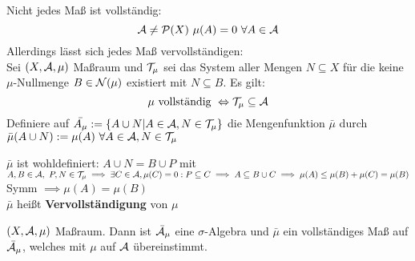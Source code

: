 \documentclass[11pt,a4paper,fleqn,openany]{report}
\begin{document}
    \begin{remark}
      Nicht jedes Maß ist vollständig:
      \[
        \script{A} \neq \script{P}(X) \ \mu(A) = 0 \ \forall A \in \script{A}
      \]
      Allerdings lässt sich jedes Maß vervollständigen:\\
      Sei $(X, \mathcal{A}, \mu)$ Maßraum und $\mathcal{T}_{\mu}$ sei das System aller Mengen $N \subseteq X$ für die keine $\mu$-Nullmenge $B \in \mathcal{N}(\mu)$ existiert mit $N \subseteq B$. Es gilt:\\
      \[
        \mu \text{ vollständig } \Leftrightarrow \mathcal{T}_{\mu} \subseteq \mathcal{A}
      \]
      Definiere auf $\bar{A_{\mu}} := \{A \cup N | A \in \mathcal{A}, N \in \mathcal{T}_{\mu}\}$ die Mengenfunktion $\bar{\mu}$ durch $\bar{\mu}(A\cup N) := \mu(A) \ \forall A \in \mathcal{A}, N\in \mathcal{T}_{\mu}$
    \end{remark}

    \begin{remark}
      $\bar{\mu}$ ist wohldefiniert: $A \cup N = B \cup P$ mit $A,B\in \mathcal{A}, \ P,N \in \mathcal{T}_{\mu} \implies \exists C \in \mathcal{A}, \mu(C) = 0: P \subseteq C \implies A \subseteq B \cup C \implies \mu(A) \leq \mu(B) + \mu(C) = \mu(B)$\\
      Symm $\implies \mu(A) = \mu(B)$\\
      $\bar{\mu}$ heißt \textbf{Vervollständigung} von $\mu$
    \end{remark}

    \begin{theorem}
      $(X,\mathcal{A}, \mu)$ Maßraum. Dann ist $\bar{\mathcal{A}}_{\mu}$ eine $\sigma$-Algebra und $\bar{\mu}$ ein vollständiges Maß auf $\bar{\mathcal{A}}_{\mu}$, welches mit $\mu$ auf $\mathcal{A}$ übereinstimmt.
    \end{theorem}
\end{document}
